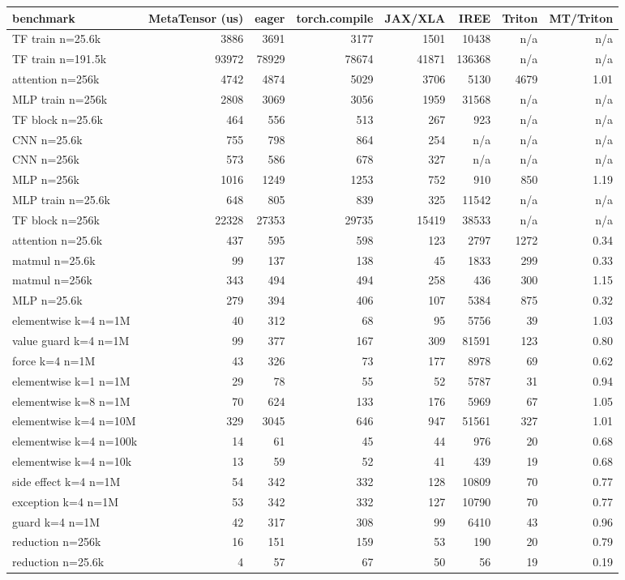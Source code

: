 \begin{tabular}{lrrrrrrr}
\toprule
benchmark & MetaTensor (us) & eager & torch.compile & JAX/XLA & IREE & Triton & MT/Triton \\
\midrule
TF train n=25.6k & 3886 & 3691 & 3177 & 1501 & 10438 & n/a & n/a \\
TF train n=191.5k & 93972 & 78929 & 78674 & 41871 & 136368 & n/a & n/a \\
attention n=256k & 4742 & 4874 & 5029 & 3706 & 5130 & 4679 & 1.01 \\
MLP train n=256k & 2808 & 3069 & 3056 & 1959 & 31568 & n/a & n/a \\
TF block n=25.6k & 464 & 556 & 513 & 267 & 923 & n/a & n/a \\
CNN n=25.6k & 755 & 798 & 864 & 254 & n/a & n/a & n/a \\
CNN n=256k & 573 & 586 & 678 & 327 & n/a & n/a & n/a \\
MLP n=256k & 1016 & 1249 & 1253 & 752 & 910 & 850 & 1.19 \\
MLP train n=25.6k & 648 & 805 & 839 & 325 & 11542 & n/a & n/a \\
TF block n=256k & 22328 & 27353 & 29735 & 15419 & 38533 & n/a & n/a \\
attention n=25.6k & 437 & 595 & 598 & 123 & 2797 & 1272 & 0.34 \\
matmul n=25.6k & 99 & 137 & 138 & 45 & 1833 & 299 & 0.33 \\
matmul n=256k & 343 & 494 & 494 & 258 & 436 & 300 & 1.15 \\
MLP n=25.6k & 279 & 394 & 406 & 107 & 5384 & 875 & 0.32 \\
elementwise k=4 n=1M & 40 & 312 & 68 & 95 & 5756 & 39 & 1.03 \\
value guard k=4 n=1M & 99 & 377 & 167 & 309 & 81591 & 123 & 0.80 \\
force k=4 n=1M & 43 & 326 & 73 & 177 & 8978 & 69 & 0.62 \\
elementwise k=1 n=1M & 29 & 78 & 55 & 52 & 5787 & 31 & 0.94 \\
elementwise k=8 n=1M & 70 & 624 & 133 & 176 & 5969 & 67 & 1.05 \\
elementwise k=4 n=10M & 329 & 3045 & 646 & 947 & 51561 & 327 & 1.01 \\
elementwise k=4 n=100k & 14 & 61 & 45 & 44 & 976 & 20 & 0.68 \\
elementwise k=4 n=10k & 13 & 59 & 52 & 41 & 439 & 19 & 0.68 \\
side effect k=4 n=1M & 54 & 342 & 332 & 128 & 10809 & 70 & 0.77 \\
exception k=4 n=1M & 53 & 342 & 332 & 127 & 10790 & 70 & 0.77 \\
guard k=4 n=1M & 42 & 317 & 308 & 99 & 6410 & 43 & 0.96 \\
reduction n=256k & 16 & 151 & 159 & 53 & 190 & 20 & 0.79 \\
reduction n=25.6k & 4 & 57 & 67 & 50 & 56 & 19 & 0.19 \\
\bottomrule
\end{tabular}
